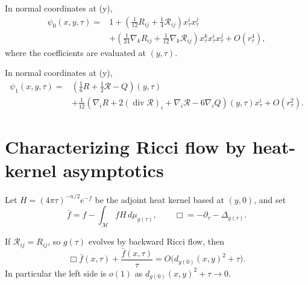 \begin{lemma}
\label{lem:chow-iii-psi-zero-expansion}
In normal coordinates at (y),
\[
 \begin{aligned}
 \psi_0(x,y,\tau)={}&1+
 \left(\frac1{12}R_{ij}+\frac14\mathcal R_{ij}\right)x_\tau^ix_\tau^j\\
 &+\left(\frac1{24}\nabla_kR_{ij}
          +\frac1{12}\nabla_k\mathcal R_{ij}\right)
 x_\tau^kx_\tau^ix_\tau^j+O(r_\tau^4),
 \end{aligned}
\]
where the coefficients are evaluated at \((y,\tau)\).
\end{lemma}

\begin{lemma}
\label{lem:chow-iii-psi-one-expansion}
In normal coordinates at (y),
\[
 \begin{aligned}
 \psi_1(x,y,\tau)={}&
 \left(\frac16R+\frac12\mathcal R-Q\right)(y,\tau)\\
 &+\frac1{12}\left(\nabla_iR+2(\operatorname{div}\mathcal R)_i
 +\nabla_i\mathcal R-6\nabla_iQ\right)(y,\tau)x_\tau^i
 +O(r_\tau^2).
 \end{aligned}
\]
\end{lemma}

\section{Characterizing Ricci flow by heat-kernel asymptotics}

Let \(H=(4\pi\tau)^{-n/2}e^{-f}\) be the adjoint heat kernel based at
\((y,0)\), and set
\[
 \bar f=f-\int_{\mathcal M}fH\,d\mu_{g(\tau)},
 \qquad \Box=-\partial_\tau-\Delta_{g(\tau)}.
\]

\begin{claim}
\label{clm:chow-iii-heat-kernel-characterizes-ricci-flow}
If \(\mathcal R_{ij}=R_{ij}\), so \(g(\tau)\) evolves by backward Ricci flow,
then
\[
 \Box\bar f(x,\tau)+\frac{\bar f(x,\tau)}{\tau}
 =O\bigl(d_{g(0)}(x,y)^2+\tau\bigr).
\]
In particular the left side is \(o(1)\) as
\(d_{g(0)}(x,y)^2+\tau\to0\).
\end{claim}

